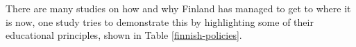 \documentclass[11pt]{article}
\begin{document}
There are many studies on how and why Finland has managed to get to where it is now, one study tries to demonstrate this by highlighting some of their educational principles, shown in Table \ref{finnish-policies}.

\begin{table}[]
\end{table}
\end{document}
